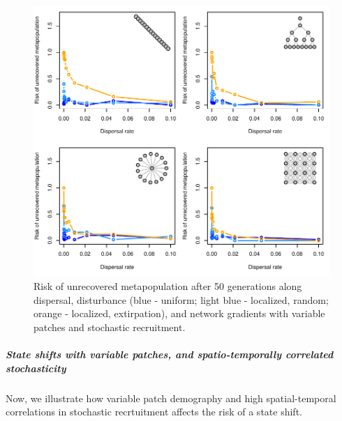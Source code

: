 \documentclass[]{article}
\let\oldsubparagraph\subparagraph
\renewcommand{\subparagraph}[1]{\oldsubparagraph{#1}\mbox{}}
\begin{document}
\begin{figure}[H]

{\centering \includegraphics{Managing_for_ecological_surprises_in_metapopulations_makeHTML_files/figure-latex/state shift with variable patches and stochasticity-1} 

}

\caption{Risk of unrecovered metapopulation after 50 generations along dispersal, disturbance (blue - uniform; light blue - localized, random; orange - localized, extirpation), and network gradients with variable patches and stochastic recruitment.}\label{fig:state shift with variable patches and stochasticity}
\end{figure}

\hypertarget{state-shifts-with-variable-patches-and-spatio-temporally-correlated-stochasticity}{%
\subparagraph{State shifts with variable patches, and spatio-temporally
correlated
stochasticity}\label{state-shifts-with-variable-patches-and-spatio-temporally-correlated-stochasticity}}

Now, we illustrate how variable patch demography and high
spatial-temporal correlations in stochastic recrtuitment affects the
risk of a state shift.
\end{document}
